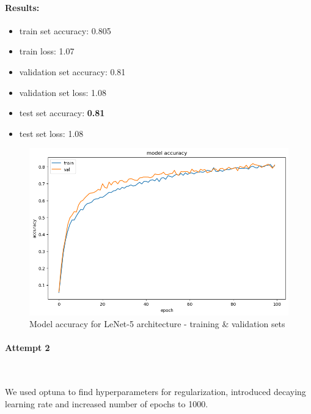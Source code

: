 \documentclass[12pt]{article}
\begin{document}
        \paragraph{Results:}
          \begin{itemize}
            \item train set accuracy: 0.805
            \item train loss: 1.07
            \item validation set accuracy: 0.81
            \item validation set loss: 1.08
            \item test set accuracy: \textbf{0.81}
            \item test set loss: 1.08
          \end{itemize}
              \begin{figure}[H]
                \includegraphics[width=\linewidth]{images/lenet.png}
                \caption{Model accuracy for LeNet-5 architecture - training \& validation sets}
                \label{fig:lenet}
              \end{figure}
        \paragraph{Attempt 2} \mbox{} \\
        \par We used optuna to find hyperparameters for regularization,
        introduced decaying learning rate and increased number of epochs to 1000.
\end{document}
